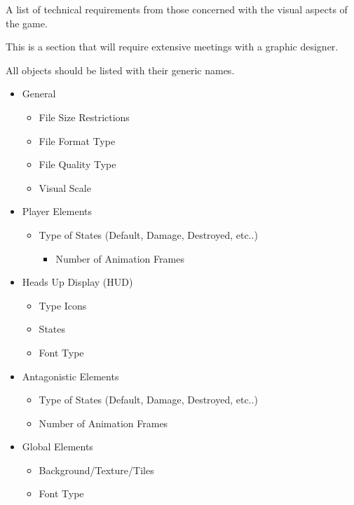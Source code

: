 \begin{guidance}
A list of technical requirements from those concerned with the visual aspects of the game.

This is a section that will require extensive meetings with a graphic designer.

All objects should be listed with their generic names.

\begin{itemize}[label=\textbullet]
  \item General
  \begin{itemize}[label=$\circ$]
    \item File Size Restrictions
    \item File Format Type
    \item File Quality Type
    \item Visual Scale
  \end{itemize}
  \item Player Elements
  \begin{itemize}[label=$\circ$]
    \item Type of States (Default, Damage, Destroyed, etc..)
    \begin{itemize}[label=\sqbullet]
      \item Number of Animation Frames
    \end{itemize}
  \end{itemize}
  \item Heads Up Display (HUD)
  \begin{itemize}[label=$\circ$]
    \item Type Icons
    \item States
    \item Font Type
  \end{itemize}
  \item Antagonistic Elements
  \begin{itemize}[label=$\circ$]
    \item Type of States (Default, Damage, Destroyed, etc..)
    \item Number of Animation Frames
  \end{itemize}
  \item Global Elements
  \begin{itemize}[label=$\circ$]
    \item Background/Texture/Tiles
    \item Font Type
  \end{itemize}
\end{itemize}
\end{guidance}
